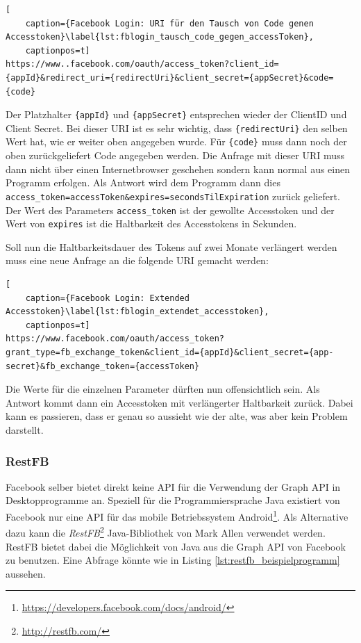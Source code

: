 \begin{lstlisting}[
    caption={Facebook Login: URI für den Tausch von Code genen Accesstoken}\label{lst:fblogin_tausch_code_gegen_accessToken},
    captionpos=t]
https://www..facebook.com/oauth/access_token?client_id={appId}&redirect_uri={redirectUri}&client_secret={appSecret}&code={code}
\end{lstlisting}

Der Platzhalter \texttt{\{appId\}} und \texttt{\{appSecret\}} entsprechen wieder der ClientID und Client Secret. Bei dieser URI ist es sehr wichtig, dass \texttt{\{redirectUri\}} den selben Wert hat, wie er weiter oben angegeben wurde. Für \texttt{\{code\}} muss dann noch der oben zurückgeliefert Code angegeben werden. Die Anfrage mit dieser URI muss dann nicht über einen Internetbrowser geschehen sondern kann normal aus einen Programm erfolgen. Als Antwort wird dem Programm dann dies \texttt{access\_token={accessToken}\&expires={secondsTilExpiration}} zurück geliefert. Der Wert des Parameters \texttt{access\_token} ist der gewollte Accesstoken und der Wert von \texttt{expires} ist die Haltbarkeit des Accesstokens in Sekunden.

Soll nun die Haltbarkeitsdauer des Tokens auf zwei Monate verlängert werden muss eine neue Anfrage an die folgende URI gemacht werden:

\begin{lstlisting}[
    caption={Facebook Login: Extended Accesstoken}\label{lst:fblogin_extendet_accesstoken},
    captionpos=t]
https://www.facebook.com/oauth/access_token?grant_type=fb_exchange_token&client_id={appId}&client_secret={app-secret}&fb_exchange_token={accessToken}
\end{lstlisting} 

Die Werte für die einzelnen Parameter dürften nun offensichtlich sein. Als Antwort kommt dann ein Accesstoken mit verlängerter Haltbarkeit zurück. Dabei kann es passieren, dass er genau so aussieht wie der alte, was aber kein Problem darstellt.



\subsubsection{RestFB} %
\label{ssub:restfb}

Facebook selber bietet direkt keine API für die Verwendung der Graph API in Desktopprogramme an. Speziell für die Programmiersprache Java existiert von Facebook nur eine API für das mobile Betriebssystem Android\footnote{\url{https://developers.facebook.com/docs/android/}}. Als Alternative dazu kann die \emph{RestFB}\footnote{\url{ http://restfb.com/}} Java-Bibliothek von Mark Allen verwendet werden. RestFB bietet dabei die Möglichkeit von Java aus die Graph API von Facebook zu benutzen. Eine Abfrage könnte wie in Listing \ref{lst:restfb_beispielprogramm} aussehen.

